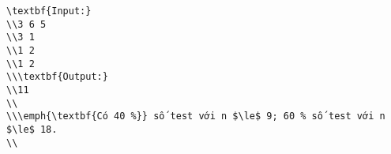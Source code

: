 \begin{verbatim}
\textbf{Input:}
\\3 6 5
\\3 1
\\1 2
\\1 2
\\\textbf{Output:}
\\11
\\
\\\emph{\textbf{Có 40 %}} số test với n $\le$ 9; 60 % số test với n $\le$ 18.
\\\end{verbatim}